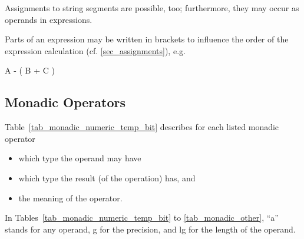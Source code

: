 Assignments to string segments are possible, too; furthermore, they may
occur as operands in expressions.

Parts of an expression may be written in brackets to influence the order
of the expression calculation (cf. \ref{sec_assignments}), e.g.

A - ( B + C )

\subsection{Monadic Operators}   %

Table~\ref{tab_monadic_numeric_temp_bit}
 describes for each listed monadic operator
\begin{itemize}
\item which type the operand may have
\item which type the result (of the operation) has, and
\item the meaning of the operator.
\end{itemize}
In Tables~\ref{tab_monadic_numeric_temp_bit} to \ref{tab_monadic_other}, ``a'' stands for any operand, g for the precision, and lg for
the length of the operand.

